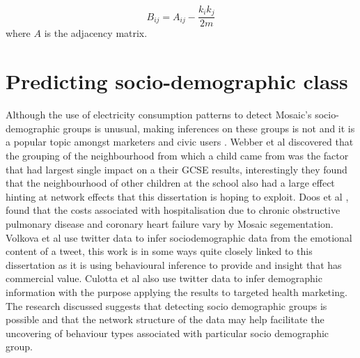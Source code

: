 \begin{equation}
\label{eq:mod2}
    B_{ij}=A_{ij}-\frac{k_i k_j}{2m}
\end{equation}
where $A$ is the adjacency matrix.


\section{Predicting socio-demographic class}

Although the use of electricity consumption patterns to detect Mosaic's socio-demographic groups is unusual, making inferences on these groups is not and it is a popular topic amongst marketers \cite{leventhal2016} and civic users \cite{generatingaleedsgeodemographicclassificationapplicationsinpolicycommerceandhealthearthandenvironment2016} \cite{limited2015}. Webber et al \cite{webber2007} discovered that the grouping of the neighbourhood from which a child came from was the factor that had largest single impact on a their GCSE results, interestingly they found that the neighbourhood of other children at the school also had a large effect hinting at network effects that this dissertation is hoping to exploit. Doos et al \cite{doos2013}, found that the costs associated with hospitalisation due to chronic obstructive pulmonary disease and coronary heart failure vary by Mosaic segementation. Volkova et al \cite{volkova2015} use twitter data to infer sociodemographic data from the emotional content of a tweet, this work is in some ways quite closely linked to this dissertation as it is using behavioural inference to provide and insight that has commercial value. Culotta et al \cite{culotta2015} also use twitter data to infer demographic information with the purpose applying the results to targeted health marketing. The research discussed suggests that detecting socio demographic groups is possible and that the network structure of the data may help facilitate the uncovering of behaviour types associated with particular socio demographic group.

